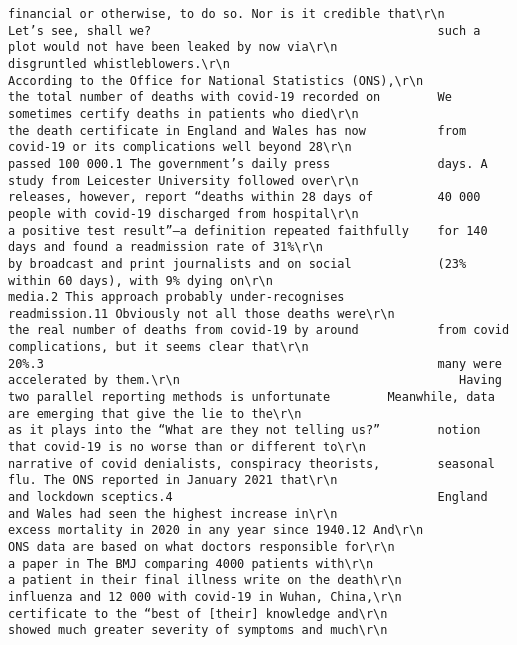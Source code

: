 \documentclass[
]{book}
\begin{document}
\begin{verbatim}
financial or otherwise, to do so. Nor is it credible that\r\n                                       Let’s see, shall we?                                        such a plot would not have been leaked by now via\r\n                                                                                                   disgruntled whistleblowers.\r\n                                       According to the Office for National Statistics (ONS),\r\n                                       the total number of deaths with covid-19 recorded on        We sometimes certify deaths in patients who died\r\n                                       the death certificate in England and Wales has now          from covid-19 or its complications well beyond 28\r\n                                       passed 100 000.1 The government’s daily press               days. A study from Leicester University followed over\r\n                                       releases, however, report “deaths within 28 days of         40 000 people with covid-19 discharged from hospital\r\n                                       a positive test result”—a definition repeated faithfully    for 140 days and found a readmission rate of 31%\r\n                                       by broadcast and print journalists and on social            (23% within 60 days), with 9% dying on\r\n                                       media.2 This approach probably under-recognises             readmission.11 Obviously not all those deaths were\r\n                                       the real number of deaths from covid-19 by around           from covid complications, but it seems clear that\r\n                                       20%.3                                                       many were accelerated by them.\r\n                                       Having two parallel reporting methods is unfortunate        Meanwhile, data are emerging that give the lie to the\r\n                                       as it plays into the “What are they not telling us?”        notion that covid-19 is no worse than or different to\r\n                                       narrative of covid denialists, conspiracy theorists,        seasonal flu. The ONS reported in January 2021 that\r\n                                       and lockdown sceptics.4                                     England and Wales had seen the highest increase in\r\n                                                                                                   excess mortality in 2020 in any year since 1940.12 And\r\n                                       ONS data are based on what doctors responsible for\r\n                                                                                                   a paper in The BMJ comparing 4000 patients with\r\n                                       a patient in their final illness write on the death\r\n                                                                                                   influenza and 12 000 with covid-19 in Wuhan, China,\r\n                                       certificate to the “best of [their] knowledge and\r\n                                                                                                   showed much greater severity of symptoms and much\r\n                        
\end{verbatim}
\end{document}
